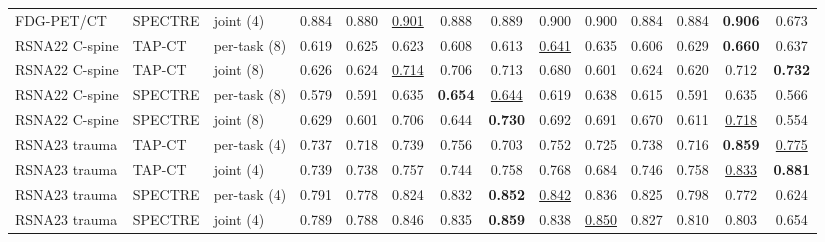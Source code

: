 \begin{tabular}{lllccccccccccc}
FDG-PET/CT & SPECTRE & joint (4) & \cellcolor{modebest}0.884 & \cellcolor{modebest}0.880 & \cellcolor{modebest}\underline{0.901} & \cellcolor{modebest}0.888 & \cellcolor{modebest}0.889 & \cellcolor{modebest}0.900 & \cellcolor{modebest}0.900 & 0.884 & \cellcolor{modebest}0.884 & \cellcolor{modebest}\textbf{0.906} & \cellcolor{modebest}0.673 \\
\addlinespace[2pt]
RSNA22 C-spine & TAP-CT & per-task (8) & 0.619 & \cellcolor{modebest}0.625 & 0.623 & 0.608 & 0.613 & \underline{0.641} & \cellcolor{modebest}0.635 & 0.606 & \cellcolor{modebest}0.629 & \textbf{0.660} & 0.637 \\
RSNA22 C-spine & TAP-CT & joint (8) & \cellcolor{modebest}0.626 & 0.624 & \cellcolor{modebest}\underline{0.714} & \cellcolor{modebest}0.706 & \cellcolor{modebest}0.713 & \cellcolor{modebest}0.680 & 0.601 & \cellcolor{modebest}0.624 & 0.620 & \cellcolor{modebest}0.712 & \cellcolor{modebest}\textbf{0.732} \\
\addlinespace[2pt]
RSNA22 C-spine & SPECTRE & per-task (8) & 0.579 & 0.591 & 0.635 & \cellcolor{modebest}\textbf{0.654} & \underline{0.644} & 0.619 & 0.638 & 0.615 & 0.591 & 0.635 & \cellcolor{modebest}0.566 \\
RSNA22 C-spine & SPECTRE & joint (8) & \cellcolor{modebest}0.629 & \cellcolor{modebest}0.601 & \cellcolor{modebest}0.706 & 0.644 & \cellcolor{modebest}\textbf{0.730} & \cellcolor{modebest}0.692 & \cellcolor{modebest}0.691 & \cellcolor{modebest}0.670 & \cellcolor{modebest}0.611 & \cellcolor{modebest}\underline{0.718} & 0.554 \\
\addlinespace[2pt]
RSNA23 trauma & TAP-CT & per-task (4) & 0.737 & 0.718 & 0.739 & \cellcolor{modebest}0.756 & 0.703 & 0.752 & \cellcolor{modebest}0.725 & 0.738 & 0.716 & \cellcolor{modebest}\textbf{0.859} & \underline{0.775} \\
RSNA23 trauma & TAP-CT & joint (4) & \cellcolor{modebest}0.739 & \cellcolor{modebest}0.738 & \cellcolor{modebest}0.757 & 0.744 & \cellcolor{modebest}0.758 & \cellcolor{modebest}0.768 & 0.684 & \cellcolor{modebest}0.746 & \cellcolor{modebest}0.758 & \underline{0.833} & \cellcolor{modebest}\textbf{0.881} \\
\addlinespace[2pt]
RSNA23 trauma & SPECTRE & per-task (4) & \cellcolor{modebest}0.791 & 0.778 & 0.824 & 0.832 & \textbf{0.852} & \cellcolor{modebest}\underline{0.842} & 0.836 & 0.825 & 0.798 & 0.772 & 0.624 \\
RSNA23 trauma & SPECTRE & joint (4) & 0.789 & \cellcolor{modebest}0.788 & \cellcolor{modebest}0.846 & \cellcolor{modebest}0.835 & \cellcolor{modebest}\textbf{0.859} & 0.838 & \cellcolor{modebest}\underline{0.850} & \cellcolor{modebest}0.827 & \cellcolor{modebest}0.810 & \cellcolor{modebest}0.803 & \cellcolor{modebest}0.654 \\

\end{tabular}
